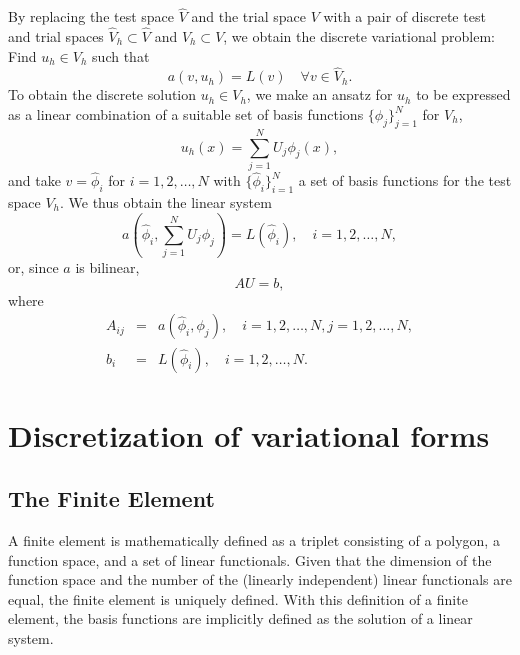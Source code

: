   By replacing the test space
$\hat{V}$ and the trial space $V$ with a pair of discrete test and
trial spaces $\hat{V}_h \subset \hat{V}$ and $V_h \subset{V}$, we
obtain the discrete variational problem: Find $u_h \in V_h$ such that
\begin{equation}
  a(v, u_h) = L(v) \quad \forall v \in \hat{V}_h.
\end{equation}
To obtain the discrete solution $u_h \in V_h$, we make an ansatz
 for $u_h$ to be expressed as a linear combination of a
suitable set of basis functions $\{\phi_j\}_{j=1}^N$ for $V_h$,
\begin{equation}
  u_h(x) = \sum_{j=1}^N U_j \phi_j(x),
\end{equation}
and take $v = \hat \phi_i$ for $i = 1,2,\ldots,N$ with
$\{\hat{\phi}_i\}_{i=1}^N$ a set of basis functions for the test space
$V_h$. We thus obtain the linear system
\begin{equation}
  a(\hat{\phi}_i, \sum_{j=1}^N U_j \phi_j) = L(\hat{\phi}_i), \quad i = 1,2,\ldots,N,
\end{equation}
or, since $a$ is bilinear,
\begin{equation}
  A U = b,
\end{equation}
where
\begin{eqnarray}
  A_{ij} &=& a(\hat{\phi}_i, \phi_j), \quad i = 1,2,\ldots,N, j = 1,2,\ldots,N, \\
  b_i &=& L(\hat{\phi}_i), \quad i = 1,2,\ldots,N.
\end{eqnarray}

\section{Discretization of variational forms}

\subsection{The Finite Element}

A finite element is mathematically defined as a triplet consisting
of a polygon, a function space, and a set of linear functionals. 
Given that the dimension of the function space and the number of
the (linearly independent) linear functionals are equal, the
finite element is uniquely defined. 
With this definition of a finite element, the basis functions
are implicitly defined as the solution of a linear system.


